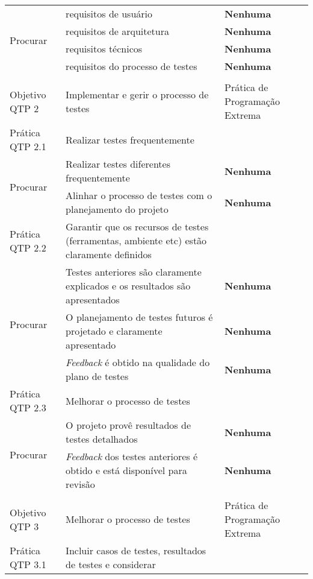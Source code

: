 \begin{longtable}{|p{2cm}|p{7cm}|p{7cm}|}
  \hline \multirow{4}{*}{Procurar} & requisitos de usuário &
  \textbf{Nenhuma} \\
  \cline{2-3} & requisitos de arquitetura & \textbf{Nenhuma} \\
  \cline{2-3} & requisitos técnicos & \textbf{Nenhuma} \\
  \cline{2-3} & requisitos do processo de testes & \textbf{Nenhuma} \\
  \hline
  & & \\
  \hline \cellcolor[gray]{0.6} Objetivo QTP 2 & \cellcolor[gray]{0.6}
  Implementar e gerir o processo de testes & Prática de Programação Extrema \\
  \hline \cellcolor[gray]{0.9} Prática QTP 2.1 & \cellcolor[gray]{0.9}
  Realizar testes frequentemente & \\
  \hline \multirow{2}{*}{Procurar} & Realizar testes diferentes
  frequentemente &
  \textbf{Nenhuma} \\
  \cline{2-3} & Alinhar o processo de testes com o planejamento do
  projeto & \textbf{Nenhuma} \\
  \hline \cellcolor[gray]{0.9} Prática QTP 2.2 & \cellcolor[gray]{0.9}
  Garantir que os recursos de testes (ferramentas, ambiente etc) estão
  claramente definidos & \\
  \hline \multirow{3}{*}{Procurar} & Testes anteriores são claramente
  explicados e os resultados são apresentados &
  \textbf{Nenhuma} \\
  \cline{2-3} & O planejamento de testes futuros é projetado e
  claramente apresentado  &  \textbf{Nenhuma} \\
  \cline{2-3} & \textit{Feedback} é obtido na qualidade do plano de
  testes  &  \textbf{Nenhuma} \\
  \hline \cellcolor[gray]{0.9} Prática QTP 2.3 & \cellcolor[gray]{0.9}
  Melhorar o processo de testes & \\
  \hline \multirow{2}{*}{Procurar} & O projeto provê resultados de
  testes detalhados &
  \textbf{Nenhuma} \\
  \cline{2-3} & \textit{Feedback} dos testes anteriores é obtido e
  está disponível para revisão & \textbf{Nenhuma} \\
  \hline
  & & \\
  \hline \cellcolor[gray]{0.6} Objetivo QTP 3 & \cellcolor[gray]{0.6}
  Melhorar o processo de testes & Prática de Programação Extrema \\
  \hline \cellcolor[gray]{0.9} Prática QTP 3.1 & \cellcolor[gray]{0.9}
  Incluir casos de testes, resultados de testes e considerar

\end{longtable}
